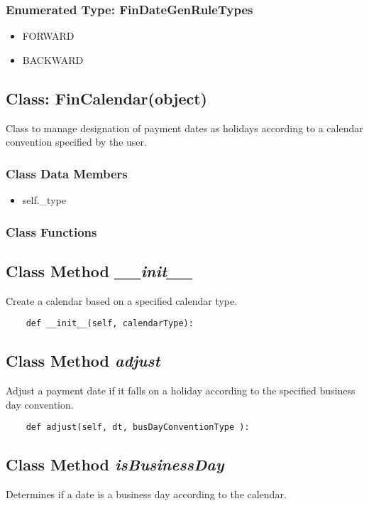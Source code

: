 \documentclass[twoside,11pt]{book}
\begin{document}
\subsubsection{Enumerated Type: FinDateGenRuleTypes}
\begin{itemize}
\item{FORWARD}
\item{BACKWARD}
\end{itemize}

\subsection{Class: FinCalendar(object)}
Class to manage designation of payment dates as holidays according to a calendar convention specified by the user. 

\subsubsection{Class Data Members}
\begin{itemize}
\item{self.\_type}
\end{itemize}

\subsubsection{Class Functions}

\subsection{Class Method {\it \_\_init\_\_}}
Create a calendar based on a specified calendar type. 

\begin{lstlisting}
    def __init__(self, calendarType):
\end{lstlisting}

\subsection{Class Method {\it adjust}}
Adjust a payment date if it falls on a holiday according to the specified business day convention. 

\begin{lstlisting}
    def adjust(self, dt, busDayConventionType ):
\end{lstlisting}

\subsection{Class Method {\it isBusinessDay}}
Determines if a date is a business day according to the calendar. 
\end{document}
